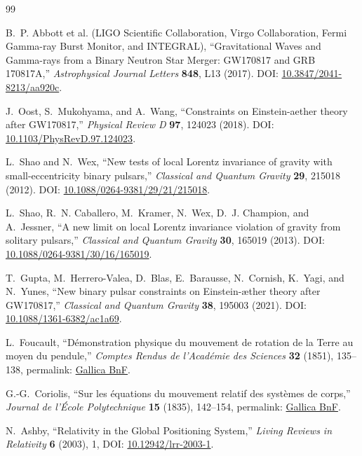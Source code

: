 \begin{thebibliography}{99}

B.~P. Abbott et al. (LIGO Scientific Collaboration, Virgo Collaboration, Fermi Gamma-ray Burst Monitor, and INTEGRAL),
``Gravitational Waves and Gamma-rays from a Binary Neutron Star Merger: GW170817 and GRB 170817A,''
\emph{Astrophysical Journal Letters} \textbf{848}, L13 (2017).
DOI: \href{https://doi.org/10.3847/2041-8213/aa920c}{10.3847/2041-8213/aa920c}.

J.~Oost, S.~Mukohyama, and A.~Wang,
``Constraints on Einstein-aether theory after GW170817,''
\emph{Physical Review D} \textbf{97}, 124023 (2018).
DOI: \href{https://doi.org/10.1103/PhysRevD.97.124023}{10.1103/PhysRevD.97.124023}.

L.~Shao and N.~Wex,
``New tests of local Lorentz invariance of gravity with small-eccentricity binary pulsars,''
\emph{Classical and Quantum Gravity} \textbf{29}, 215018 (2012).
DOI: \href{https://doi.org/10.1088/0264-9381/29/21/215018}{10.1088/0264-9381/29/21/215018}.

L.~Shao, R.~N. Caballero, M.~Kramer, N.~Wex, D.~J. Champion, and A.~Jessner,
``A new limit on local Lorentz invariance violation of gravity from solitary pulsars,''
\emph{Classical and Quantum Gravity} \textbf{30}, 165019 (2013).
DOI: \href{https://doi.org/10.1088/0264-9381/30/16/165019}{10.1088/0264-9381/30/16/165019}.

T.~Gupta, M.~Herrero-Valea, D.~Blas, E.~Barausse, N.~Cornish, K.~Yagi, and N.~Yunes,
``New binary pulsar constraints on Einstein-\ae ther theory after GW170817,''
\emph{Classical and Quantum Gravity} \textbf{38}, 195003 (2021).
DOI: \href{https://doi.org/10.1088/1361-6382/ac1a69}{10.1088/1361-6382/ac1a69}.

L.~Foucault,
``D\'emonstration physique du mouvement de rotation de la Terre au moyen du pendule,''
\emph{Comptes Rendus de l'Acad\'emie des Sciences} \textbf{32} (1851), 135--138,
permalink: \href{https://gallica.bnf.fr/ark:/12148/bpt6k2992r}{Gallica BnF}.

G.-G.~Coriolis,
``Sur les \'equations du mouvement relatif des syst\`emes de corps,''
\emph{Journal de l'\'Ecole Polytechnique} \textbf{15} (1835), 142--154,
permalink: \href{https://gallica.bnf.fr/ark:/12148/bpt6k4336791}{Gallica BnF}.

N.~Ashby,
``Relativity in the Global Positioning System,''
\emph{Living Reviews in Relativity} \textbf{6} (2003), 1,
DOI: \href{https://doi.org/10.12942/lrr-2003-1}{10.12942/lrr-2003-1}.

\end{thebibliography}
\fi
